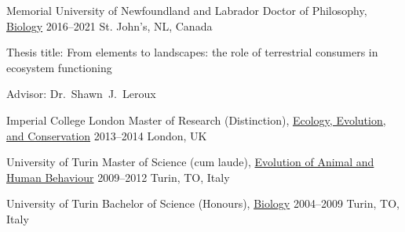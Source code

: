 

\begin{cventries}

  \cventry
    {Memorial University of Newfoundland and Labrador} %
    {Doctor of Philosophy, \href{http://www.mun.ca/biology}{Biology}} %
    {2016--2021} %
    {St. John's, NL, Canada} %
    {
      \begin{cvitems} %
        \item {Thesis title: From elements to landscapes: the role of terrestrial consumers in ecosystem functioning}
        \item {Advisor: Dr.~Shawn~J.~Leroux}
      \end{cvitems}
    }

  \cventry
    {Imperial College London} %
    {Master of Research (Distinction), \href{https://www.imperial.ac.uk/study/pg/life-sciences/ecology-evolution-conservation-research/}{Ecology, Evolution, and Conservation}} %
    {2013--2014} %
    {London, UK} %
    {}
  
  \cventry
    {University of Turin} %
    {Master of Science (cum laude), \href{https://goo.gl/rCzbq7}{Evolution of Animal and Human Behaviour}} %
    {2009--2012} %
    {Turin, TO, Italy} %
    {}
  
  \cventry
    {University of Turin} %
    {Bachelor of Science (Honours), \href{http://biologia.campusnet.unito.it/do/home.pl}{Biology}} %
    {2004--2009} %
    {Turin, TO, Italy} %
    {}
\end{cventries}
